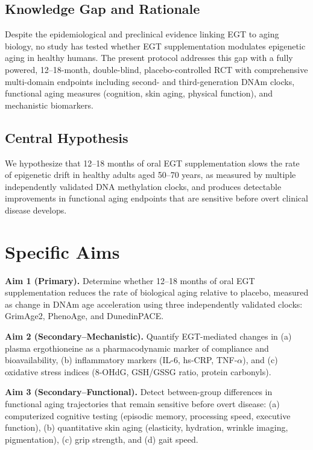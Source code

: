 \documentclass[11pt,a4paper]{article}
\begin{document}
\subsection{Knowledge Gap and Rationale}

Despite the epidemiological and preclinical evidence linking EGT to aging biology, no study has tested whether EGT supplementation modulates epigenetic aging in healthy humans. The present protocol addresses this gap with a fully powered, 12--18-month, double-blind, placebo-controlled RCT with comprehensive multi-domain endpoints including second- and third-generation DNAm clocks, functional aging measures (cognition, skin aging, physical function), and mechanistic biomarkers.

\subsection{Central Hypothesis}

We hypothesize that 12--18 months of oral EGT supplementation slows the rate of epigenetic drift in healthy adults aged 50--70 years, as measured by multiple independently validated DNA methylation clocks, and produces detectable improvements in functional aging endpoints that are sensitive before overt clinical disease develops.

\section{Specific Aims}

\textbf{Aim 1 (Primary).} Determine whether 12--18 months of oral EGT supplementation reduces the rate of biological aging relative to placebo, measured as change in DNAm age acceleration using three independently validated clocks: GrimAge2, PhenoAge, and DunedinPACE.

\textbf{Aim 2 (Secondary--Mechanistic).} Quantify EGT-mediated changes in (a) plasma ergothioneine as a pharmacodynamic marker of compliance and bioavailability, (b) inflammatory markers (IL-6, hs-CRP, TNF-$\alpha$), and (c) oxidative stress indices (8-OHdG, GSH/GSSG ratio, protein carbonyls).

\textbf{Aim 3 (Secondary--Functional).} Detect between-group differences in functional aging trajectories that remain sensitive before overt disease: (a) computerized cognitive testing (episodic memory, processing speed, executive function), (b) quantitative skin aging (elasticity, hydration, wrinkle imaging, pigmentation), (c) grip strength, and (d) gait speed.
\end{document}
